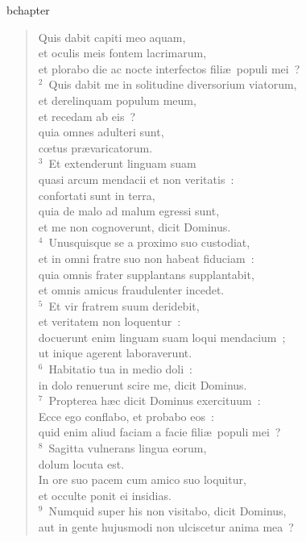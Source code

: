 bchapter\begin{flushleft}\begin{verse}\vspace{-19pt}Quis dabit capiti meo aquam,\\ et oculis meis fontem lacrimarum,\\ et plorabo die ac nocte interfectos fili\ae\ populi mei~?\\
${}^{2}$~Quis dabit me in solitudine diversorium viatorum,\\ et derelinquam populum meum,\\ et recedam ab eis~?\\ quia omnes adulteri sunt,\\ cœtus pr\ae varicatorum.\\
${}^{3}$~Et extenderunt linguam suam\\ quasi arcum mendacii et non veritatis~:\\ confortati sunt in terra,\\ quia de malo ad malum egressi sunt,\\ et me non cognoverunt, dicit Dominus.\\
${}^{4}$~Unusquisque se a proximo suo custodiat,\\ et in omni fratre suo non habeat fiduciam~:\\ quia omnis frater supplantans supplantabit,\\ et omnis amicus fraudulenter incedet.\\
${}^{5}$~Et vir fratrem suum deridebit,\\ et veritatem non loquentur~:\\ docuerunt enim linguam suam loqui mendacium~;\\ ut inique agerent laboraverunt.\\
${}^{6}$~Habitatio tua in medio doli~:\\ in dolo renuerunt scire me, dicit Dominus.\\
${}^{7}$~Propterea h\ae c dicit Dominus exercituum~:\\ Ecce ego conflabo, et probabo eos~:\\ quid enim aliud faciam a facie fili\ae\ populi mei~?\\
${}^{8}$~Sagitta vulnerans lingua eorum,\\ dolum locuta est.\\ In ore suo pacem cum amico suo loquitur,\\ et occulte ponit ei insidias.\\
${}^{9}$~Numquid super his non visitabo, dicit Dominus,\\ aut in gente hujusmodi non ulciscetur anima mea~?\\

\end{verse}
\end{flushleft}
